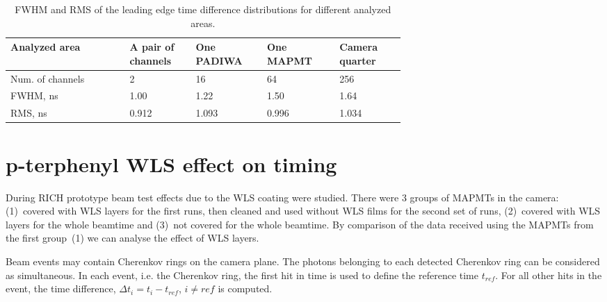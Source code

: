\documentclass[final,5p,times,twocolumn]{elsarticle}
\begin{document}
\begin{table}[h]
\centering
	\begin{tabular}{ | p{0.22\linewidth} | p{0.10\linewidth} | p{0.10\linewidth} | p{0.12\linewidth} | p{0.12\linewidth} | }
		\hline		
		\scriptsize{Analyzed area} & \scriptsize{A pair of channels} & \scriptsize{One PADIWA} & \scriptsize{One MAPMT} & \scriptsize{Camera quarter} \\
		\hline
		\scriptsize{Num. of channels} & 2 & 16 & 64 & 256\\
		\hline
		\scriptsize{FWHM, ns} & 1.00 & 1.22 & 1.50 & 1.64\\
		\hline
		\scriptsize{RMS, ns} & 0.912 & 1.093 & 0.996 & 1.034\\
		\hline
	\end{tabular}

	\caption{FWHM and RMS of the leading edge time difference distributions for different analyzed areas.}
	\label{tabl:TimePrecTable}

\end{table}


\section{p-terphenyl WLS effect on timing}

During RICH prototype beam test effects due to the WLS coating were studied. There were 3 groups of MAPMTs in the camera: (1)~covered with WLS layers for the first runs, then cleaned and used without WLS films for the second set of runs, (2)~covered with WLS layers for the whole beamtime and (3)~not covered for the whole beamtime. By comparison of the data received using the MAPMTs from the first group~(1) we can analyse the effect of WLS layers.

Beam events may contain Cherenkov rings on the camera plane. The photons belonging to each detected Cherenkov ring can be considered as simultaneous. In each event, i.e. the Cherenkov ring, the first hit in time is used to define the reference time $ t_{ref} $. For all other hits in the event, the time difference, $ \Delta t_i = t_i - t_{ref} $, $ i \neq ref $ is computed.
\end{document}
